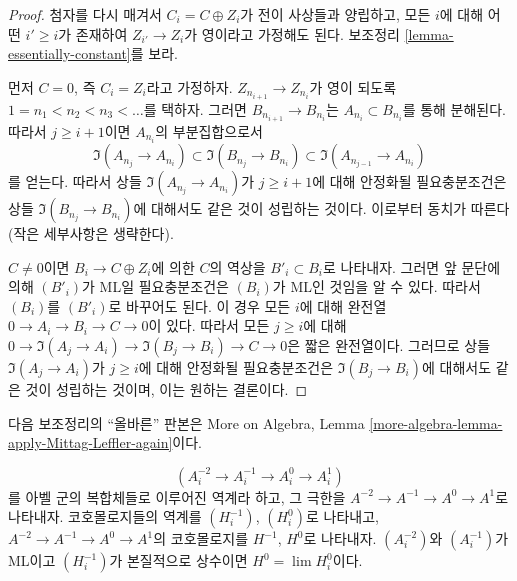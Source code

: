 \begin{proof}
첨자를 다시 매겨서 $C_i = C \oplus Z_i$가 전이 사상들과 양립하고,
모든 $i$에 대해 어떤 $i' \geq i$가 존재하여 $Z_{i'} \to Z_i$가
영이라고 가정해도 된다. 보조정리 \ref{lemma-essentially-constant}를 보라.

\medskip\noindent
먼저 $C = 0$, 즉 $C_i = Z_i$라고 가정하자.
$Z_{n_{i + 1}} \to Z_{n_i}$가 영이 되도록
$1 = n_1 < n_2 < n_3 < \ldots$를 택하자. 그러면
$B_{n_{i + 1}} \to B_{n_i}$는 $A_{n_i} \subset B_{n_i}$를 통해 분해된다.
따라서 $j \geq i + 1$이면 $A_{n_i}$의 부분집합으로서
$$
\Im(A_{n_j} \to A_{n_i}) \subset \Im(B_{n_j} \to B_{n_i}) \subset
\Im(A_{n_{j - 1}} \to A_{n_i})
$$
를 얻는다. 따라서 상들 $\Im(A_{n_j} \to A_{n_i})$가
$j \geq i + 1$에 대해 안정화될 필요충분조건은 상들
$\Im(B_{n_j} \to B_{n_i})$에 대해서도 같은 것이 성립하는 것이다.
이로부터 동치가 따른다(작은 세부사항은 생략한다).

\medskip\noindent
$C \not = 0$이면 $B_i \to C \oplus Z_i$에 의한 $C$의 역상을
$B'_i \subset B_i$로 나타내자.
그러면 앞 문단에 의해 $(B'_i)$가 ML일 필요충분조건은 $(B_i)$가 ML인
것임을 알 수 있다. 따라서 $(B_i)$를 $(B'_i)$로 바꾸어도 된다.
이 경우 모든 $i$에 대해 완전열 $0 \to A_i \to B_i \to C \to 0$이 있다.
따라서 모든 $j \geq i$에 대해
$0 \to \Im(A_j \to A_i) \to \Im(B_j \to B_i) \to C \to 0$은
짧은 완전열이다. 그러므로 상들 $\Im(A_j \to A_i)$가 $j \geq i$에
대해 안정화될 필요충분조건은 $\Im(B_j \to B_i)$에 대해서도 같은 것이
성립하는 것이며, 이는 원하는 결론이다.
\end{proof}

\noindent
다음 보조정리의 “올바른” 판본은 More on Algebra, Lemma
\ref{more-algebra-lemma-apply-Mittag-Leffler-again}이다.

\begin{lemma}
\label{lemma-apply-Mittag-Leffler-again}
$$
(A^{-2}_i \to A^{-1}_i \to A^0_i \to A^1_i)
$$
를 아벨 군의 복합체들로 이루어진 역계라 하고, 그 극한을
$A^{-2} \to A^{-1} \to A^0 \to A^1$로 나타내자. 코호몰로지들의 역계를
$(H_i^{-1})$, $(H_i^0)$로 나타내고,
$A^{-2} \to A^{-1} \to A^0 \to A^1$의 코호몰로지를
$H^{-1}$, $H^0$로 나타내자.
$(A^{-2}_i)$와 $(A^{-1}_i)$가 ML이고 $(H^{-1}_i)$가 본질적으로
상수이면 $H^0 = \lim H_i^0$이다.
\end{lemma}


